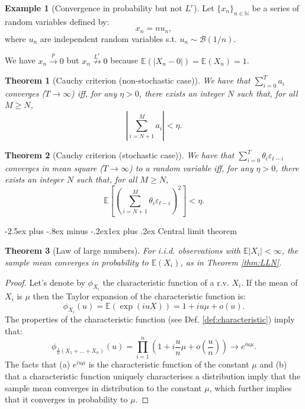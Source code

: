 \documentclass[
  11pt,
]{book}
\makeatletter
\renewcommand\subsection{\@startsection{subsection}{2}{\z@}
  {-2.5ex plus -.8ex minus -.2ex}{1ex plus .2ex}
  {\normalfont\large\bfseries\color{TextbookInk}}}
\newtheorem{theorem}{Theorem}[chapter]
\theoremstyle{definition}
\theoremstyle{definition}
\newtheorem{example}{Example}[chapter]
\theoremstyle{definition}
\theoremstyle{definition}
\theoremstyle{remark}
\makeatother
\begin{document}
\begin{example}[Convergence in probability but not $L^r$]
\protect\hypertarget{exm:plimButNotLr}{}\label{exm:plimButNotLr}Let \(\{x_n\}_{n \in \mathbb{N}}\) be a series of random variables defined by:
\[
x_n = n u_n,
\]
where \(u_n\) are independent random variables s.t. \(u_n \sim \mathcal{B}(1/n)\).

We have \(x_n \overset{p}{\rightarrow} 0\) but \(x_n \overset{L^r}{\nrightarrow} 0\) because \(\mathbb{E}(|X_n-0|)=\mathbb{E}(X_n)=1\).
\end{example}

\begin{theorem}[Cauchy criterion (non-stochastic case)]
\protect\hypertarget{thm:cauchycritstatic}{}\label{thm:cauchycritstatic}We have that \(\sum_{i=0}^{T} a_i\) converges (\(T \rightarrow \infty\)) iff, for any \(\eta > 0\), there exists an integer \(N\) such that, for all \(M\ge N\),
\[
\left|\sum_{i=N+1}^{M} a_i\right| < \eta.
\]
\end{theorem}

\begin{theorem}[Cauchy criterion (stochastic case)]
\protect\hypertarget{thm:cauchycritstochastic}{}\label{thm:cauchycritstochastic}We have that \(\sum_{i=0}^{T} \theta_i \varepsilon_{t-i}\) converges in mean square (\(T \rightarrow \infty\)) to a random variable iff, for any \(\eta > 0\), there exists an integer \(N\) such that, for all \(M\ge N\),
\[
\mathbb{E}\left[\left(\sum_{i=N+1}^{M} \theta_i \varepsilon_{t-i}\right)^2\right] < \eta.
\]
\end{theorem}

\subsection{Central limit theorem}\label{CLTappend}

\begin{theorem}[Law of large numbers]
\protect\hypertarget{thm:LLNappendix}{}\label{thm:LLNappendix}For i.i.d. observations with \(\mathbb E|X_i|<\infty\), the sample mean converges in probability to \(\mathbb E(X_i)\), as in Theorem \ref{thm:LLN}.
\end{theorem}

\begin{proof}
Let's denote by \(\phi_{X_i}\) the characteristic function of a r.v. \(X_i\). If the mean of \(X_i\) is \(\mu\) then the Taylor expansion of the characteristic function is:
\[
\phi_{X_i}(u) = \mathbb{E}(\exp(iuX)) = 1 + iu\mu + o(u).
\]
The properties of the characteristic function (see Def. \ref{def:characteristic}) imply that:
\[
\phi_{\frac{1}{n}(X_1+\dots+X_n)}(u) = \prod_{i=1}^{n} \left(1 + i\frac{u}{n}\mu + o\left(\frac{u}{n}\right) \right) \rightarrow e^{iu\mu}.
\]
The facts that (a) \(e^{iu\mu}\) is the characteristic function of the constant \(\mu\) and (b) that a characteristic function uniquely characterises a distribution imply that the sample mean converges in distribution to the constant \(\mu\), which further implies that it converges in probability to \(\mu\).
\end{proof}
\end{document}
